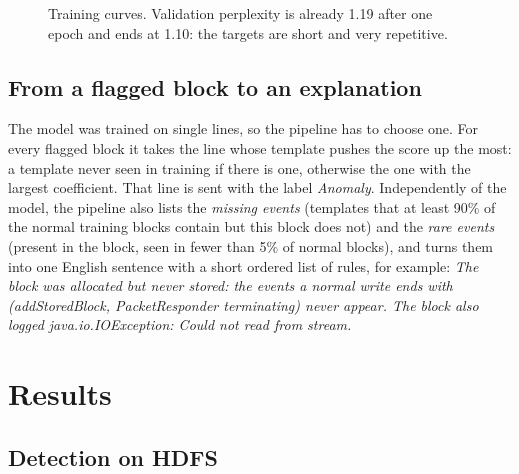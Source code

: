 \documentclass[11pt,a4paper]{article}
\begin{document}
\begin{figure}[t]
\centering
{}
\caption{Training curves. Validation perplexity is already 1.19 after one epoch and ends at 1.10:
the targets are short and very repetitive.}
\label{fig:train}
\end{figure}

\subsection{From a flagged block to an explanation}\label{sec:rules}
The model was trained on single lines, so the pipeline has to choose one. For every flagged
block it takes the line whose template pushes the score up the most: a template never seen in
training if there is one, otherwise the one with the largest coefficient. That line is sent
with the label \emph{Anomaly}. Independently of the model, the pipeline also lists the
\emph{missing events} (templates that at least 90\% of the normal training blocks contain but
this block does not) and the \emph{rare events} (present in the block, seen in fewer than 5\% of
normal blocks), and turns them into one English sentence with a short ordered list of rules, for
example: \emph{The block was allocated but never stored: the events a normal write ends with
(addStoredBlock, PacketResponder terminating) never appear. The block also logged
java.io.IOException: Could not read from stream.}

\section{Results}

\subsection{Detection on HDFS}
\end{document}
